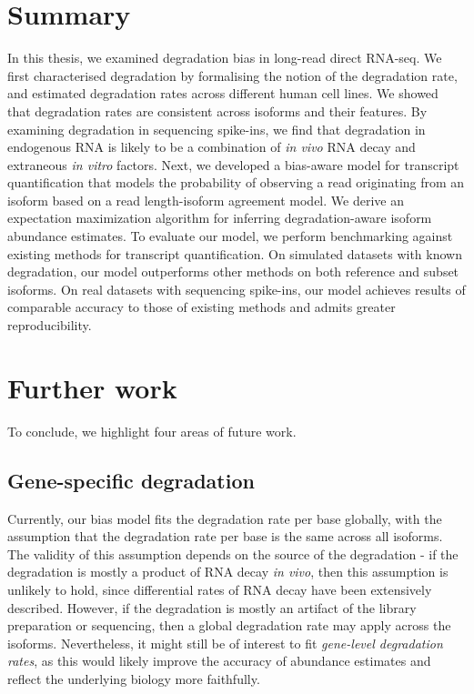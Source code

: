 
\section{Summary}

In this thesis, we examined degradation bias in long-read direct RNA-seq. We first characterised degradation by formalising the notion of the degradation rate, and estimated degradation rates across different human cell lines. We showed that degradation rates are consistent across isoforms and their features. By examining degradation in sequencing spike-ins, we find that degradation in endogenous RNA is likely to be a combination of \textit{in vivo} RNA decay and extraneous \textit{in vitro} factors. Next, we developed a bias-aware model for transcript quantification that models the probability of observing a read originating from an isoform based on a read length-isoform agreement model. We derive an expectation maximization algorithm for inferring degradation-aware isoform abundance estimates. To evaluate our model, we perform benchmarking against existing methods for transcript quantification. On simulated datasets with known degradation, our model outperforms other methods on both reference and subset isoforms. On real datasets with sequencing spike-ins, our model achieves results of comparable accuracy to those of existing methods and admits greater reproducibility. 

\section{Further work}

To conclude, we highlight four areas of future work.

\subsection{Gene-specific degradation}

Currently, our bias model fits the degradation rate per base globally, with the assumption that the degradation rate per base is the same across all isoforms. The validity of this assumption depends on the source of the degradation - if the degradation is mostly a product of RNA decay \textit{in vivo}, then this assumption is unlikely to hold, since differential rates of RNA decay have been extensively described. However, if the degradation is mostly an artifact of the library preparation or sequencing, then a global degradation rate may apply across the isoforms. Nevertheless, it might still be of interest to fit \textit{gene-level degradation rates}, as this would likely improve the accuracy of abundance estimates and reflect the underlying biology more faithfully. 

